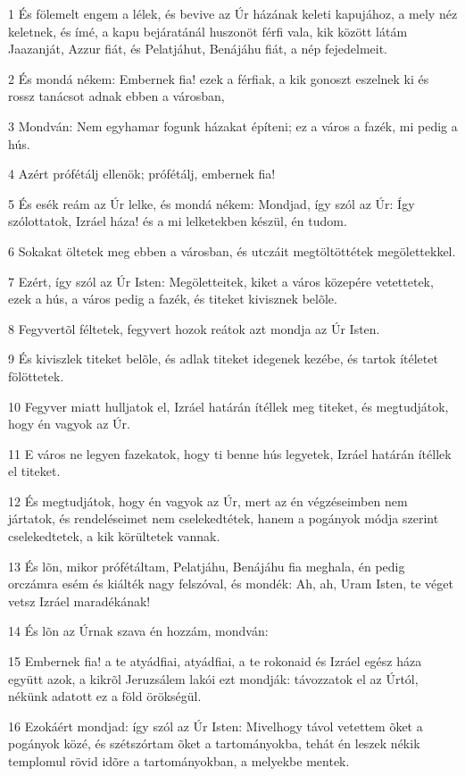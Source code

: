 \par 1 És fölemelt engem a lélek, és bevive az Úr házának keleti kapujához, a mely néz keletnek, és ímé, a kapu bejáratánál huszonöt férfi vala, kik között látám Jaazanját, Azzur fiát, és Pelatjáhut, Benájáhu fiát, a nép fejedelmeit.
\par 2 És mondá nékem: Embernek fia! ezek a férfiak, a kik gonoszt eszelnek ki és rossz tanácsot adnak ebben a városban,
\par 3 Mondván: Nem egyhamar fogunk házakat építeni; ez a város a fazék, mi pedig a hús.
\par 4 Azért prófétálj ellenök; prófétálj, embernek fia!
\par 5 És esék reám az Úr lelke, és mondá nékem: Mondjad, így szól az Úr: Így szólottatok, Izráel háza! és a mi lelketekben készül, én tudom.
\par 6 Sokakat öltetek meg ebben a városban, és utczáit megtöltöttétek megölettekkel.
\par 7 Ezért, így szól az Úr Isten: Megöletteitek, kiket a város közepére vetettetek, ezek a hús, a város pedig a fazék, és titeket kivisznek belõle.
\par 8 Fegyvertõl féltetek, fegyvert hozok reátok azt mondja az Úr Isten.
\par 9 És kiviszlek titeket belõle, és adlak titeket idegenek kezébe, és tartok ítéletet fölöttetek.
\par 10 Fegyver miatt hulljatok el, Izráel határán ítéllek meg titeket, és megtudjátok, hogy én vagyok az Úr.
\par 11 E város ne legyen fazekatok, hogy ti benne hús legyetek, Izráel határán ítéllek el titeket.
\par 12 És megtudjátok, hogy én vagyok az Úr, mert az én végzéseimben nem jártatok, és rendeléseimet nem cselekedtétek, hanem a pogányok módja szerint cselekedtetek, a kik körültetek vannak.
\par 13 És lõn, mikor prófétáltam, Pelatjáhu, Benájáhu fia meghala, én pedig orczámra esém és kiálték nagy felszóval, és mondék: Ah, ah, Uram Isten, te véget vetsz Izráel maradékának!
\par 14 És lõn az Úrnak szava én hozzám, mondván:
\par 15 Embernek fia! a te atyádfiai, atyádfiai, a te rokonaid és Izráel egész háza együtt azok, a kikrõl Jeruzsálem lakói ezt mondják: távozzatok el az Úrtól, nékünk adatott ez a föld örökségül.
\par 16 Ezokáért mondjad: így szól az Úr Isten: Mivelhogy távol vetettem õket a pogányok közé, és szétszórtam õket a tartományokba, tehát én leszek nékik templomul rövid idõre a tartományokban, a melyekbe mentek.
